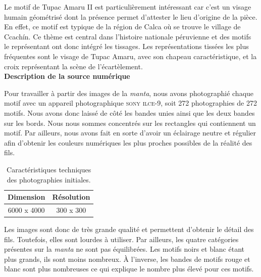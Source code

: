 \documentclass[a4paper, twoside, 12pt]{book}
\begin{document}
Le motif de Tupac Amaru II est particulièrement intéressant car c'est un visage humain géométrisé dont la présence permet d'attester le lieu d'origine de la pièce. En effet, ce motif est typique de la région de Calca où se trouve le village de Ccachín. Ce thème est central dans l'histoire nationale péruvienne et des motifs le représentant ont donc intégré les tissages. Les représentations tissées les plus fréquentes sont le visage de Tupac Amaru, avec son chapeau caractéristique, et la croix représentant la scène de l'écartèlement. \\


\textbf{Description de la source numérique}

Pour travailler à partir des images de la \textit{manta}, nous avons photographié chaque motif avec un appareil photographique \textsc{sony ilce-}\small9\normalsize, soit 272 photographies de 272 motifs. Nous avons donc laissé de côté les bandes unies ainsi que les deux bandes sur les bords. Nous nous sommes concentrés sur les rectangles qui contiennent un motif. Par ailleurs, nous avons fait en sorte d'avoir un éclairage neutre et régulier afin d'obtenir les couleurs numériques les plus proches possibles de la réalité des fils.

\begin{table}[!h]
    \centering
    \begin{tabular}{|c|c|}
        \hline
        Dimension & Résolution \\ \hline 
        6000 x 4000 & 300 x 300 \\ \hline
    \end{tabular}
    \caption{Caractéristiques techniques des photographies initiales.}
    \label{tab:tableau1}
\end{table}

Les images sont donc de très grande qualité et permettent d'obtenir le détail des fils. Toutefois, elles sont lourdes à utiliser. Par ailleurs, les quatre catégories présentes sur la \textit{manta} ne sont pas équilibrées. Les motifs noirs et blanc étant plus grands, ils sont moins nombreux. À l'inverse, les bandes de motifs rouge et blanc sont plus nombreuses ce qui explique le nombre plus élevé pour ces motifs.
\end{document}
